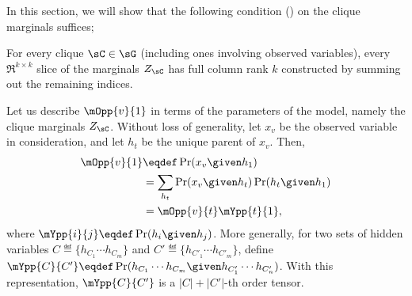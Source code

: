 In this section, we will show that the following condition
  () on the clique marginals suffices;
\begin{assumption*}[2]
For every clique $\sC \in \sG$ (including ones involving observed variables),
  every $\Re^{k \times k}$ slice of the marginals $Z_\sC$ has full column
  rank $k$ constructed by summing out the remaining indices.
\end{assumption*}

%
%
%
%
%

Let us describe $\mOpp{v}{1}$ in terms of the parameters of the model,
  namely the clique marginals $Z_\sC$.
Without loss of generality, let $x_v$ be the observed variable in
  consideration, and let $h_t$ be the unique parent of $x_v$.
Then, 
\begin{align*}
  \mOpp{v}{1} &\eqdef \Pr( x_v \given h_1 )  \\
              &= \sum_{h_t} \Pr( x_v \given h_t ) \Pr( h_t \given h_1 ) \\
              &= \mOpp{v}{t} \mYpp{t}{1},
\end{align*}
where $\mYpp{i}{j} \eqdef \Pr( h_i \given h_j )$. 
More generally, for two sets of hidden variables $C \eqdef \{h_{C_1}
\cdots h_{C_m} \}$ and $C' \eqdef \{h_{C'_1} \cdots h_{C'_m} \}$, 
define $\mYpp{C}{C'} \eqdef \Pr( h_{C_1} \cdots h_{C_m} \given h_{C'_1}
\cdots h_{C'_n} )$. 
With this representation, $\mYpp{C}{C'}$ is a $|C| + |C'|$-th order
tensor.
  
